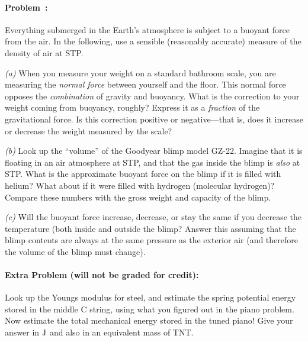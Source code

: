 \documentclass[12pt]{article}
\begin{document}
\paragraph{Problem~\theproblem:}%
Everything submerged in the Earth's atmosphere is subject to a buoyant
force from the air.  In the following, use a sensible (reasonably
accurate) measure of the density of air at STP.

\textsl{(a)} When you measure your weight on a standard bathroom
scale, you are measuring the \emph{normal force} between yourself and
the floor.  This normal force opposes the \emph{combination} of
gravity and buoyancy.  What is the correction to your weight coming
from buoyancy, roughly?  Express it as a \emph{fraction} of the
gravitational force.  Is this correction positive or negative---that
is, does it increase or decrease the weight measured by the scale?

\textsl{(b)} Look up the ``volume'' of the Goodyear blimp model GZ-22.
Imagine that it is floating in an air atmosphere at STP, and that the
gas inside the blimp is \emph{also} at STP.  What is the approximate
buoyant force on the blimp if it is filled with helium?  What about if
it were filled with hydrogen (molecular hydrogen)?  Compare these
numbers with the gross weight and capacity of the blimp.

\textsl{(c)} Will the buoyant force increase, decrease, or stay the
same if you decrease the temperature (both inside and outside the blimp?
Answer this assuming that the blimp contents are always at the same pressure as the
exterior air (and therefore the volume of the blimp must change).

\paragraph{Extra Problem (will not be graded for credit):}%
Look up the Youngs modulus for steel, and estimate the spring
potential energy stored in the middle C string, using what you figured
out in the piano problem. Now estimate the total mechanical energy
stored in the tuned piano! Give your answer in $\mathrm{J}$ and also in an
equivalent mass of TNT.
\end{document}
